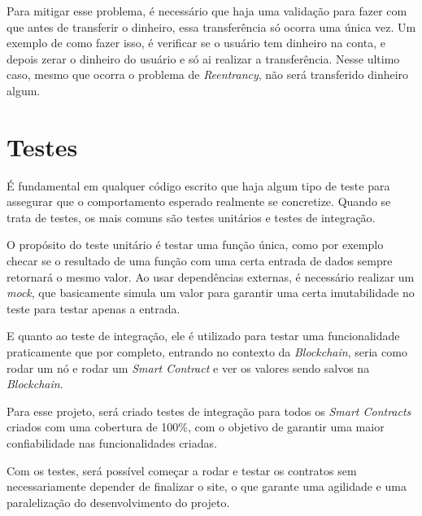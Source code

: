 Para mitigar esse problema, é necessário que haja uma validação para fazer com que antes de transferir o dinheiro, essa transferência só ocorra uma única vez. Um exemplo de como fazer isso, é verificar se o usuário tem dinheiro na conta, e depois zerar o dinheiro do usuário e só ai realizar a transferência. Nesse ultimo caso, mesmo que ocorra o problema de \textit{Reentrancy}, não será transferido dinheiro algum.

\section{Testes}

É fundamental em qualquer código escrito que haja algum tipo de teste para assegurar que o comportamento esperado realmente se concretize. Quando se trata de testes, os mais comuns são testes unitários e testes de integração.

O propósito do teste unitário é testar uma função única, como por exemplo checar se o resultado de uma função com uma certa entrada de dados sempre retornará o mesmo valor. Ao usar dependências externas, é necessário realizar um \textit{mock}, que basicamente simula um valor para garantir uma certa imutabilidade no teste para testar apenas a entrada.

E quanto ao teste de integração, ele é utilizado para testar uma funcionalidade praticamente que por completo, entrando no contexto da \textit{Blockchain}, seria como rodar um nó e rodar um \textit{Smart Contract} e ver os valores sendo salvos na \textit{Blockchain}.

Para esse projeto, será criado testes de integração para todos os \textit{Smart Contracts} criados com uma cobertura de 100\%, com o objetivo de garantir uma maior confiabilidade nas funcionalidades criadas. 

Com os testes, será possível começar a rodar e testar os contratos sem necessariamente depender de finalizar o site, o que garante uma agilidade e uma paralelização do desenvolvimento do projeto. 



